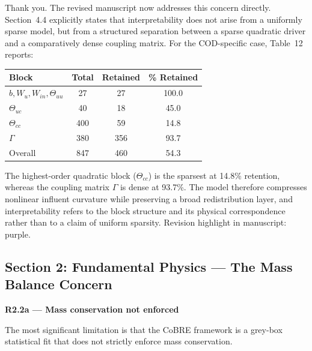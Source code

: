 \documentclass[a4paper,11pt]{article}
\newcommand{\reviewlabel}[1]{\noindent\textbf{\textcolor{accentblue}{#1}}\par\medskip}
\newcommand{\revhighlight}[2]{\textcolor{#1}{Revision highlight in manuscript: #2.}}
\begin{document}
Thank you. The revised manuscript now addresses this concern directly. Section~4.4 explicitly states that interpretability does not arise from a uniformly sparse model, but from a structured separation between a sparse quadratic driver and a comparatively dense coupling matrix. For the COD-specific case, Table~12 reports:

\begin{center}
\small
\begin{tabular}{lccc}
\toprule
Block & Total & Retained & \% Retained \\
\midrule
$b, W_u, W_{in}, \Theta_{uu}$ & 27 & 27 & 100.0 \\
$\Theta_{uc}$ & 40 & 18 & 45.0 \\
$\Theta_{cc}$ & 400 & 59 & 14.8 \\
$\Gamma$ & 380 & 356 & 93.7 \\
\midrule
Overall & 847 & 460 & 54.3 \\
\bottomrule
\end{tabular}
\end{center}

The highest-order quadratic block ($\Theta_{cc}$) is the sparsest at 14.8\% retention, whereas the coupling matrix $\Gamma$ is dense at 93.7\%. The model therefore compresses nonlinear influent curvature while preserving a broad redistribution layer, and interpretability refers to the block structure and its physical correspondence rather than to a claim of uniform sparsity. \revhighlight{revRtwoOne}{purple}

\subsection*{Section 2: Fundamental Physics --- The Mass Balance Concern}

\reviewlabel{R2.2a --- Mass conservation not enforced}
\begin{reviewbox}
The most significant limitation is that the CoBRE framework is a grey-box statistical fit that does not strictly enforce mass conservation.
\end{reviewbox}
\end{document}
